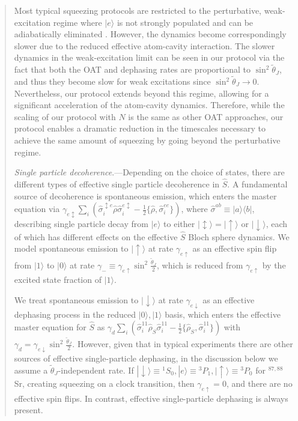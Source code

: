 \begin{abstract}
Most typical squeezing protocols are restricted to the perturbative, weak-excitation regime where $|e\rangle$ is not strongly populated and can be adiabatically eliminated \cite{Schleier-Smith2010, Borregaard2017, Pedrozo-Penafiel2020, Colombo2022, Borregaard2017a, Luo2024, Leroux2010, Braverman2019, Barberena2023b,Mivehvar2021}. However, the dynamics become correspondingly slower due to the reduced effective atom-cavity interaction. The slower dynamics  in the weak-excitation limit can be seen  in our protocol via the fact that both the OAT and dephasing rates are proportional to $\sin^2 \tilde{\theta}_J$, and  thus they become slow for weak excitations since  $\sin^2 \tilde{\theta}_J \to 0$. Nevertheless, our protocol extends beyond this regime, allowing for a  significant acceleration of the atom-cavity  dynamics. 
Therefore, while the scaling of our protocol with $N$ is the same as other OAT approaches, our protocol enables a dramatic reduction in the timescales necessary to achieve the same amount of squeezing by going beyond the perturbative regime.

{\it Single particle decoherence}.---Depending on the choice of states, there are different types of effective single particle decoherence in $\hat{S}$. A fundamental source of decoherence is spontaneous emission, which enters the master equation via
$\gamma_{e\updownarrow} \sum_i \left(\hat \sigma_i^{\updownarrow e} \hat \rho \hat \sigma_i^{e \updownarrow} - \frac{1}{2} \{\hat \rho , \hat \sigma_i^{ee}\} \right)$, where $ \hat \sigma^{ab} \equiv |a \rangle \langle b|$,
describing single particle  decay from $|e \rangle$ to either $|{\updownarrow}\rangle =|{\uparrow}\rangle$ or $ |{\downarrow} \rangle$, each of which has different effects on the effective $\hat S$ Bloch sphere dynamics. We model spontaneous emission to $|{\uparrow}\rangle$ at rate $\gamma_{e {\uparrow}}$ as an effective spin flip from $|1\rangle$ to $|0 \rangle$ at rate $\gamma_- \equiv \gamma_{e{\uparrow}} \sin^2 \frac{\tilde{\theta}_J}{2}$, which is reduced from $\gamma_{e{\uparrow}}$ by the excited state fraction of $|1 \rangle$. 

 
We treat spontaneous emission to $|{\downarrow} \rangle$ at rate $\gamma_{e \downarrow}$ as an effective dephasing process in the reduced $|0\rangle, |1\rangle$ basis, which enters the effective master equation for $\hat S$ as $\gamma_d \sum_i \left(\hat \sigma_i^{11} \hat \rho_S \hat \sigma_i^{11} - \frac{1}{2} \{\hat \rho_S , \hat \sigma_i^{11}\} \right)$
with $\gamma_d = \gamma_{e \downarrow} \sin^2 \frac{\tilde{\theta}_J}{2}$. However, given that in typical experiments there are other sources of effective single-particle dephasing, in the discussion below we  assume a $\tilde{\theta}_J$-independent rate. If $|{\downarrow}\rangle \equiv {^1S_0}, |e\rangle \equiv {^3 P_1}, |{\uparrow} \rangle \equiv {^3 P_0}$ for $^{87,88}$Sr, creating squeezing on a clock transition, then $\gamma_{e{\uparrow}} = 0$, and there are no effective spin flips. In contrast, effective single-particle dephasing is always present.


\end{abstract}
